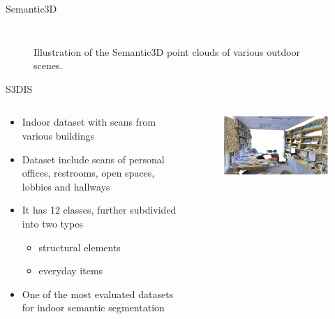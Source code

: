 \documentclass[aspectratio=169]{beamer}
\begin{document}
\begin{frame}{Semantic3D}
\begin{columns}
\begin{column}{0.33\textwidth}
\begin{figure}
            \end{figure}
        \end{column}
    \end{columns}
    \begin{figure}
        \centering
        \caption{Illustration of the Semantic3D point clouds of various outdoor scenes.}
    \end{figure}
\end{frame}
\begin{frame}{S3DIS}
    \begin{columns}
        \begin{column}{0.6\textwidth}
            \begin{itemize}
                \item Indoor dataset with scans from various buildings
                \item Dataset include scans of personal offices, restrooms, open spaces, lobbies and hallways
                \item It has 12 classes, further subdivided into two types
                \begin{itemize}
                    \item structural elements 
                    \item everyday items
                \end{itemize}
                \item One of the most evaluated datasets for indoor semantic segmentation
            \end{itemize}
        \end{column}
        \begin{column}{0.4\textwidth}
            \begin{figure}
                \centering
                \includegraphics[scale=0.35]{images/s3dis/s3dis_sample_1.jpg}

\end{figure}
\end{column}
\end{columns}
\end{frame}
\end{document}
